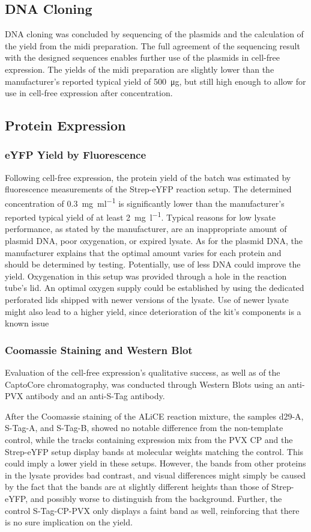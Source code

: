 \subsection{DNA Cloning}
DNA cloning was concluded by sequencing of the plasmids and the calculation of the yield from the midi preparation. The full agreement of the sequencing result with the designed sequences enables further use of the plasmids in cell-free expression. The yields of the midi preparation are slightly lower than the manufacturer's reported typical yield of \SI{500}{\micro\gram}, but still high enough to allow for use in cell-free expression after concentration. 

\subsection{Protein Expression}
\subsubsection{eYFP Yield by Fluorescence}
Following cell-free expression, the protein yield of the batch was estimated by fluorescence measurements of the Strep-eYFP reaction setup. The determined concentration of \SI{0.3}{\milli\gram\per\milli\litre} is significantly lower than the manufacturer's reported typical yield of at least \SI{2}{\milli\gram\per\litre}. Typical reasons for low lysate performance, as stated by the manufacturer, are an inappropriate amount of plasmid DNA, poor oxygenation, or expired lysate. As for the plasmid DNA, the manufacturer explains that the optimal amount varies for each protein and should be determined by testing. Potentially, use of less DNA could improve the yield. Oxygenation in this setup was provided through a hole in the reaction tube's lid. An optimal oxygen supply could be established by using the dedicated perforated lids shipped with newer versions of the lysate. Use of newer lysate might also lead to a higher yield, since deterioration of the kit's components is a known issue 

\subsubsection{Coomassie Staining and Western Blot}
Evaluation of the cell-free expression's qualitative success, as well as of the CaptoCore chromatography, was conducted through Western Blots using an anti-PVX antibody and an anti-S-Tag antibody.

After the Coomassie staining of the ALiCE reaction mixture, the samples d29-A, S-Tag-A, and S-Tag-B, showed no notable difference from the non-template control, while the tracks containing expression mix from the PVX CP and the Strep-eYFP setup display bands at molecular weights matching the control. This could imply a lower yield in these setups. However, the bands from other proteins in the lysate provides bad contrast, and visual differences might simply be caused by the fact that the bands are at slightly different heights than those of Strep-eYFP, and possibly worse to distinguish from the background. Further, the control S-Tag-CP-PVX only displays a faint band as well, reinforcing that there is no sure implication on the yield. 

